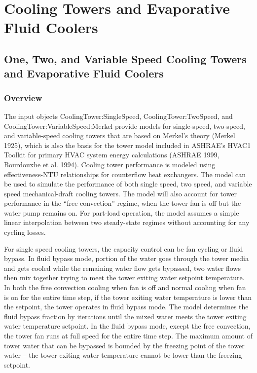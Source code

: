 \section{Cooling Towers and Evaporative Fluid Coolers }\label{cooling-towers-and-evaporative-fluid-coolers}

\subsection{One, Two, and Variable Speed Cooling Towers and Evaporative Fluid Coolers}\label{one-two-and-variable-speed-cooling-towers-and-evaporative-fluid-coolers}

\subsubsection{Overview}\label{overview-012}

The input objects CoolingTower:SingleSpeed, CoolingTower:TwoSpeed, and CoolingTower:VariableSpeed:Merkel provide models for single-speed, two-speed, and variable-speed cooling towers that are based on Merkel's theory (Merkel 1925), which is also the basis for the tower model included in ASHRAE's HVAC1 Toolkit for primary HVAC system energy calculations (ASHRAE 1999, Bourdouxhe et al. 1994). Cooling tower performance is modeled using effectiveness-NTU relationships for counterflow heat exchangers. The model can be used to simulate the performance of both single speed, two speed, and variable speed mechanical-draft cooling towers. The model will also account for tower performance in the ``free convection'' regime, when the tower fan is off but the water pump remains on. For part-load operation, the model assumes a simple linear interpolation between two steady-state regimes without accounting for any cycling losses.

For single speed cooling towers, the capacity control can be fan cycling or fluid bypass. In fluid bypass mode, portion of the water goes through the tower media and gets cooled while the remaining water flow gets bypassed, two water flows then mix together trying to meet the tower exiting water setpoint temperature. In both the free convection cooling when fan is off and normal cooling when fan is on for the entire time step, if the tower exiting water temperature is lower than the setpoint, the tower operates in fluid bypass mode. The model determines the fluid bypass fraction by iterations until the mixed water meets the tower exiting water temperature setpoint. In the fluid bypass mode, except the free convection, the tower fan runs at full speed for the entire time step. The maximum amount of tower water that can be bypassed is bounded by the freezing point of the tower water -- the tower exiting water temperature cannot be lower than the freezing setpoint.

